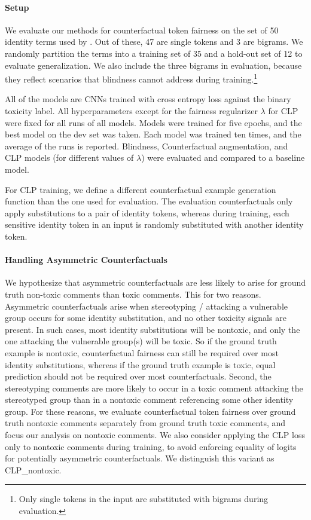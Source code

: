 \documentclass[letterpaper]{article} %
\theoremstyle{definition}
\begin{document}
\paragraph{Setup} We evaluate our methods for counterfactual token fairness on the set of 50 identity terms used by \citeauthor{Dixon18}. Out of these, 47 are single tokens and 3 are bigrams. We randomly partition the terms into a training set of 35 and a hold-out set of 12 to evaluate generalization. We also include the three bigrams in evaluation, because they reflect scenarios that blindness cannot address during training.\footnote{Only single tokens in the input are substituted with bigrams during evaluation.} 

All of the models are CNNs trained with cross entropy loss against the binary toxicity label. All hyperparameters except for the fairness regularizer $\lambda$ for CLP were fixed for all runs of all models. Models were trained for five epochs, and the best model on the dev set was taken. Each model was trained ten times, and the average of the runs is reported. Blindness, Counterfactual augmentation, and CLP models (for different values of $\lambda$)  were evaluated and compared to a baseline model. 

For CLP training, we define a different counterfactual example generation function than the one used for evaluation. The evaluation counterfactuals only apply substitutions to a pair of identity tokens, whereas during training, each sensitive identity token in an input is randomly substituted with another identity token. 

\paragraph{Handling Asymmetric Counterfactuals}
We hypothesize that asymmetric counterfactuals are less likely to arise for ground truth non-toxic comments than toxic comments. This for two reasons. 
Asymmetric counterfactuals arise when stereotyping / attacking a vulnerable group occurs for some identity substitution, and no other toxicity signals are present.
In such cases, most identity substitutions will be nontoxic, and only the one attacking the vulnerable group(s) will be toxic. So if the ground truth example is nontoxic, counterfactual fairness can still be required over most identity substitutions, whereas if the ground truth example is toxic, equal prediction should not be required over most counterfactuals.
Second, the stereotyping comments are more likely to occur in a toxic comment attacking the stereotyped group than in a nontoxic comment referencing some other identity group. 
For these reasons, we evaluate counterfactual token fairness over ground truth nontoxic comments separately from ground truth toxic comments, and focus our analysis on nontoxic comments.
We also consider applying the CLP loss only to nontoxic comments during training, to avoid enforcing equality of logits for potentially asymmetric counterfactuals. We distinguish this variant as CLP\_nontoxic.
\end{document}
